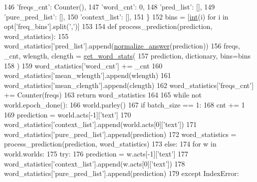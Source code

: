 \begin{DoxyCode}
146         \textcolor{stringliteral}{'freqs\_cnt'}: Counter(),
147         \textcolor{stringliteral}{'word\_cnt'}: 0,
148         \textcolor{stringliteral}{'pred\_list'}: [],
149         \textcolor{stringliteral}{'pure\_pred\_list'}: [],
150         \textcolor{stringliteral}{'context\_list'}: [],
151     \}
152     bins = [\hyperlink{namespacelanguage__model_1_1eval__ppl_a7d12ee00479673c5c8d1f6d01faa272a}{int}(i) \textcolor{keywordflow}{for} i \textcolor{keywordflow}{in} opt[\textcolor{stringliteral}{'freq\_bins'}].split(\textcolor{stringliteral}{','})]
153 
154     \textcolor{keyword}{def }process\_prediction(prediction, word\_statistics):
155         word\_statistics[\textcolor{stringliteral}{'pred\_list'}].append(\hyperlink{namespaceparlai_1_1core_1_1metrics_ae7769a6b628f41081e0f43043d52031a}{normalize\_answer}(prediction))
156         freqs, \_cnt, wlength, clength = \hyperlink{namespaceprojects_1_1controllable__dialogue_1_1eval__wordstat_af8f7aeddab4a5c7f0a5597bdb09f40ae}{get\_word\_stats}(
157             prediction, dictionary, bins=bins
158         )
159         word\_statistics[\textcolor{stringliteral}{'word\_cnt'}] += \_cnt
160         word\_statistics[\textcolor{stringliteral}{'mean\_wlength'}].append(wlength)
161         word\_statistics[\textcolor{stringliteral}{'mean\_clength'}].append(clength)
162         word\_statistics[\textcolor{stringliteral}{'freqs\_cnt'}] += Counter(freqs)
163         \textcolor{keywordflow}{return} word\_statistics
164 
165     \textcolor{keywordflow}{while} \textcolor{keywordflow}{not} world.epoch\_done():
166         world.parley()
167         \textcolor{keywordflow}{if} batch\_size == 1:
168             cnt += 1
169             prediction = world.acts[-1][\textcolor{stringliteral}{'text'}]
170             word\_statistics[\textcolor{stringliteral}{'context\_list'}].append(world.acts[0][\textcolor{stringliteral}{'text'}])
171             word\_statistics[\textcolor{stringliteral}{'pure\_pred\_list'}].append(prediction)
172             word\_statistics = process\_prediction(prediction, word\_statistics)
173         \textcolor{keywordflow}{else}:
174             \textcolor{keywordflow}{for} w \textcolor{keywordflow}{in} world.worlds:
175                 \textcolor{keywordflow}{try}:
176                     prediction = w.acts[-1][\textcolor{stringliteral}{'text'}]
177                     word\_statistics[\textcolor{stringliteral}{'context\_list'}].append(w.acts[0][\textcolor{stringliteral}{'text'}])
178                     word\_statistics[\textcolor{stringliteral}{'pure\_pred\_list'}].append(prediction)
179                 \textcolor{keywordflow}{except} IndexError:

\end{DoxyCode}
